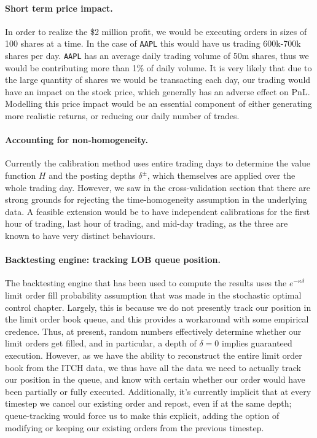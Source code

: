 \paragraph{Short term price impact.} In order to realize the \$2 million profit, we would be executing orders in sizes of 100 shares at a time. In the case of \texttt{AAPL} this would have us trading 600k-700k shares per day. \texttt{AAPL} has an average daily trading volume of 50m shares, thus we would be contributing more than 1\% of daily volume. It is very likely that due to the large quantity of shares we would be transacting each day, our trading would have an impact on the stock price, which generally has an adverse effect on PnL. Modelling this price impact would be an essential component of either generating more realistic returns, or reducing our daily number of trades.

\paragraph{Accounting for non-homogeneity.} Currently the calibration method uses entire trading days to determine the value function $H$ and the posting depths $\delta^\pm$, which themselves are applied over the whole trading day. However, we saw in the cross-validation section that there are strong grounds for rejecting the time-homogeneity assumption in the underlying data. A feasible extension would be to have independent calibrations for the first hour of trading, last hour of trading, and mid-day trading, as the three are known to have very distinct behaviours. 

\paragraph{Backtesting engine: tracking LOB queue position.} The backtesting engine that has been used to compute the results uses the $e^{-\kappa \delta}$ limit order fill probability assumption that was made in the stochastic optimal control chapter. Largely, this is because we do not presently track our position in the limit order book queue, and this provides a workaround with some empirical credence. Thus, at present, random numbers effectively determine whether our limit orders get filled, and in particular, a depth of $\delta=0$ implies guaranteed execution. However, as we have the ability to reconstruct the entire limit order book from the ITCH data, we thus have all the data we need to actually track our position in the queue, and know with certain whether our order would have been partially or fully executed. Additionally, it's currently implicit that at every timestep we cancel our existing order and repost, even if at the same depth; queue-tracking would force us to make this explicit, adding the option of modifying or keeping our existing orders from the previous timestep. 

